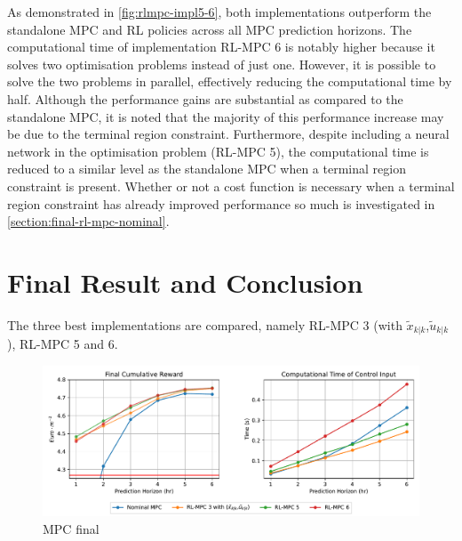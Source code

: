 As demonstrated in \autoref{fig:rlmpc-impl5-6}, both implementations outperform the standalone MPC and RL policies across all MPC prediction horizons. The computational time of implementation RL-MPC 6 is notably higher because it solves two optimisation problems instead of just one. However, it is possible to solve the two problems in parallel, effectively reducing the computational time by half. Although the performance gains are substantial as compared to the standalone MPC, it is noted that the majority of this performance increase may be due to the terminal region constraint. Furthermore, despite including a neural network in the optimisation problem (RL-MPC 5), the computational time is reduced to a similar level as the standalone MPC when a terminal region constraint is present. Whether or not a cost function is necessary when a terminal region constraint has already improved performance so much is investigated in \autoref{section:final-rl-mpc-nominal}.

\section{Final Result and Conclusion} \label{section:final-rl-mpc-nominal}
The three best implementations are compared, namely RL-MPC 3 (with $\tilde{x}_{k|k}$,$\tilde{u}_{k|k}$), RL-MPC 5 and 6.
\begin{figure}[H]
	\centering
	\includegraphics[width=\textwidth]{figures/rl_mpc_impl_final.pdf}
	\caption{MPC final }
	\label{fig:rlmpc-final}
\end{figure}


